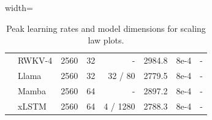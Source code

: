 \documentclass[dvipsnames]{article}
\begin{document}
\begin{appendix}
\begin{table}[htbp]
\begin{adjustbox}{width=\textwidth}
\begin{tabular}{llrrrrrr}
    & RWKV-4 & 2560                 & 32               & -                       & 2984.8          & 8e-4    & -       \\
    & Llama  & 2560                 & 32               & 32 / 80                 & 2779.5          & 8e-4    & -       \\
    & Mamba  & 2560                 & 64               & -                       & 2897.2          & 8e-4    & -       \\
    & xLSTM  & 2560                 & 64               & 4 / 1280                & 2788.3          & 8e-4    & -       \\
    \bottomrule
\end{tabular}
    \end{adjustbox}
    \vspace{0.1cm}
    \caption{Peak learning rates and model dimensions for scaling law plots.}
    \label{tab:spaj_peaklr}
\end{table}

\end{appendix}
\end{document}
